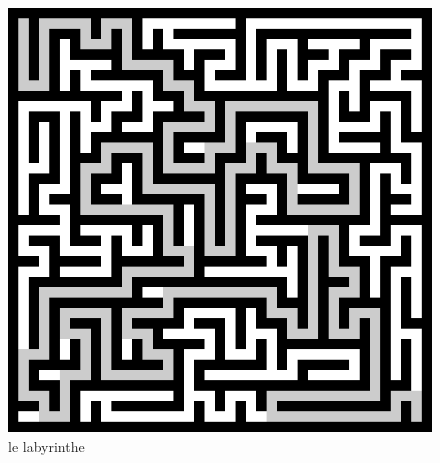 \documentclass[11pt,a4paper]{article}
\begin{document}
\begin{figure}[p]
\begin{center}
\includegraphics[scale=0.4]{laby.png}
\caption{le labyrinthe}
\end{center}
\end{figure}
\end{document}
